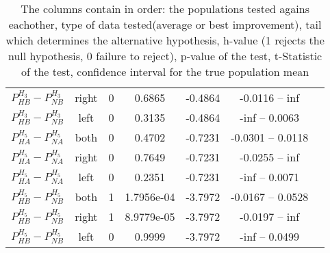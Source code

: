 \documentclass[../main.tex]{subfiles}
\begin{document}
\begin{table}
\begin{tabular}{ccccccc}
            $P^{H_3}_{HB}-P^{H_3}_{NB}$    & right & 0 & 0.6865    & -0.4864  & -0.0116 -- inf     \\
            $P^{H_3}_{HB}-P^{H_3}_{NB}$    & left  & 0 & 0.3135    & -0.4864  & -inf -- 0.0063     \\
            $P^{H_5}_{HA}-P^{H_5}_{NA}$    & both  & 0 & 0.4702    & -0.7231  & -0.0301 -- 0.0118  \\
            $P^{H_5}_{HA}-P^{H_5}_{NA}$    & right & 0 & 0.7649    & -0.7231  & -0.0255 -- inf     \\
            $P^{H_5}_{HA}-P^{H_5}_{NA}$    & left  & 0 & 0.2351    & -0.7231  & -inf -- 0.0071     \\
            $P^{H_5}_{HB}-P^{H_5}_{NB}$    & both  & 1 & 1.7956e-04& -3.7972  & -0.0167 -- 0.0528  \\
            $P^{H_5}_{HB}-P^{H_5}_{NB}$    & right & 1 & 8.9779e-05& -3.7972  & -0.0197 -- inf     \\
            $P^{H_5}_{HB}-P^{H_5}_{NB}$    & left  & 0 & 0.9999    & -3.7972  & -inf -- 0.0499     \\
        \hline
        \end{tabular}
    \caption*{The columns contain in order: the populations tested agains eachother, type of data tested(average or best improvement), tail which determines the alternative hypothesis, h-value (1 rejects the null hypothesis, 0 failure to reject), p-value of the test, t-Statistic of the test, confidence interval for the true population mean}
   \label{tab:tTest}
\end{table}
\end{document}
